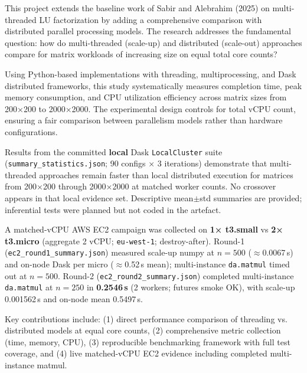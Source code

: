 This project extends the baseline work of Sabir and Alebrahim (2025) on multi-threaded LU factorization by adding a comprehensive comparison with distributed parallel processing models. The research addresses the fundamental question: how do multi-threaded (scale-up) and distributed (scale-out) approaches compare for matrix workloads of increasing size on equal total core counts?

Using Python-based implementations with threading, multiprocessing, and Dask distributed frameworks, this study systematically measures completion time, peak memory consumption, and CPU utilization efficiency across matrix sizes from 200×200 to 2000×2000. The experimental design controls for total vCPU count, ensuring a fair comparison between parallelism models rather than hardware configurations.

Results from the committed \textbf{local} Dask \texttt{LocalCluster} suite (\texttt{summary\_statistics.json}; 90 configs × 3 iterations) demonstrate that multi-threaded approaches remain faster than local distributed execution for matrices from 200×200 through 2000×2000 at matched worker counts. No crossover appears in that local evidence set. Descriptive mean$\pm$std summaries are provided; inferential tests were planned but not coded in the artefact.

A matched-vCPU AWS EC2 campaign was collected on \textbf{1× t3.small} vs \textbf{2× t3.micro} (aggregate 2 vCPU; \texttt{eu-west-1}; destroy-after). Round-1 (\texttt{ec2\_round1\_summary.json}) measured scale-up numpy at $n{=}500$ ($\approx$0.0067\,s) and on-node Dask per micro ($\approx$0.52\,s mean); multi-instance \texttt{da.matmul} timed out at $n{=}500$. Round-2 (\texttt{ec2\_round2\_summary.json}) completed multi-instance \texttt{da.matmul} at $n{=}250$ in \textbf{0.2546\,s} (2 workers; futures smoke OK), with scale-up 0.001562\,s and on-node mean 0.5497\,s.

Key contributions include: (1) direct performance comparison of threading vs. distributed models at equal core counts, (2) comprehensive metric collection (time, memory, CPU), (3) reproducible benchmarking framework with full test coverage, and (4) live matched-vCPU EC2 evidence including completed multi-instance matmul.
